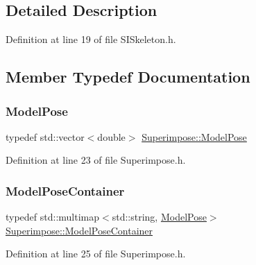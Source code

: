 \subsection{Detailed Description}


Definition at line 19 of file S\+I\+Skeleton.\+h.



\subsection{Member Typedef Documentation}
\mbox{\label{classSuperimpose_a85d40a5caf19f486d1e0c15c0a025378}} 
\subsubsection{\texorpdfstring{Model\+Pose}{ModelPose}}
{\footnotesize\ttfamily typedef std\+::vector$<$double$>$ \mbox{\hyperlink{classSuperimpose_a85d40a5caf19f486d1e0c15c0a025378}{Superimpose\+::\+Model\+Pose}}\hspace{0.3cm}{\ttfamily [inherited]}}



Definition at line 23 of file Superimpose.\+h.

\mbox{\label{classSuperimpose_a178e3d4e2def6635bfcf9454dd4b5d22}} 
\subsubsection{\texorpdfstring{Model\+Pose\+Container}{ModelPoseContainer}}
{\footnotesize\ttfamily typedef std\+::multimap$<$std\+::string, \mbox{\hyperlink{classSuperimpose_a85d40a5caf19f486d1e0c15c0a025378}{Model\+Pose}}$>$ \mbox{\hyperlink{classSuperimpose_a178e3d4e2def6635bfcf9454dd4b5d22}{Superimpose\+::\+Model\+Pose\+Container}}\hspace{0.3cm}{\ttfamily [inherited]}}



Definition at line 25 of file Superimpose.\+h.

\mbox{\label{classSuperimpose_a1e02e0225687b42296dcfee4eadf8a55}} 
